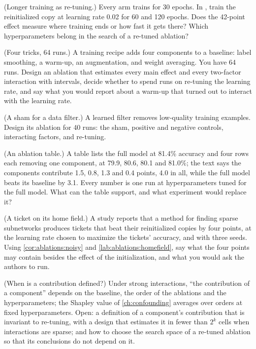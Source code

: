 \begin{refsection}
\begin{exercises}
\item \labwork (Longer training as re-tuning.) Every arm trains for 30 epochs. In , train the reinitialized copy at learning rate 0.02 for 60 and 120 epochs. Does the 42-point effect measure where training ends or how fast it gets there? Which hyperparameters belong in the search of a re-tuned ablation?\label{ex:ablations:epochs}

\item \design (Four tricks, 64 runs.) A training recipe adds four components to a baseline: label smoothing, a warm-up, an augmentation, and weight averaging. You have 64 runs. Design an ablation that estimates every main effect and every two-factor interaction with intervals, decide whether to spend runs on re-tuning the learning rate, and say what you would report about a warm-up that turned out to interact with the learning rate.\label{ex:ablations:design}

\item \design (A sham for a data filter.) A learned filter removes low-quality training examples. Design its ablation for 40 runs: the sham, positive and negative controls, interacting factors, and re-tuning.\label{ex:ablations:datafilter}

\item \critique (An ablation table.) A table lists the full model at 81.4\% accuracy and four rows each removing one component, at 79.9, 80.6, 80.1 and 81.0\%; the text says the components contribute 1.5, 0.8, 1.3 and 0.4 points, 4.0 in all, while the full model beats its baseline by 3.1. Every number is one run at hyperparameters tuned for the full model. What can the table support, and what experiment would replace it?\label{ex:ablations:critique1}

\item \critique (A ticket on its home field.) A study reports that a method for finding sparse subnetworks produces tickets that beat their reinitialized copies by four points, at the learning rate chosen to maximize the tickets' accuracy, and with three seeds. Using \cref{cor:ablations:noisy} and \cref{lab:ablations:homefield}, say what the four points may contain besides the effect of the initialization, and what you would ask the authors to run.\label{ex:ablations:critique2}

\item \research (When is a contribution defined?) Under strong interactions, \enquote{the contribution of a component} depends on the baseline, the order of the ablations and the hyperparameters; the Shapley value of \cref{ch:confounding} averages over orders at fixed hyperparameters. Open: a definition of a component's contribution that is invariant to re-tuning, with a design that estimates it in fewer than $2^k$ cells when interactions are sparse; and how to choose the search space of a re-tuned ablation so that its conclusions do not depend on it.\label{ex:ablations:research}
\end{exercises}


\end{refsection}

